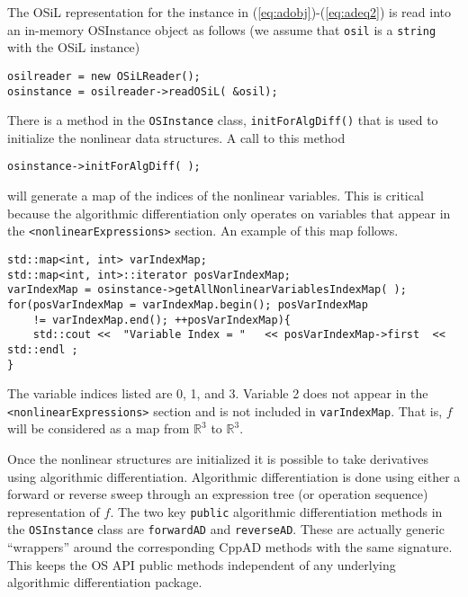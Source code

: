 \documentclass[11pt]{article}
\renewcommand{\_}{{\char"5F}}
\renewcommand{\{}{{\char"7B}}
\renewcommand{\}}{{\char"7D}}
\renewcommand{\^}{{\char"0D}}
\renewcommand{\'}{{\char"0D}}
\begin{document}
The OSiL representation for the instance  in  (\ref{eq:adobj})-(\ref{eq:adeq2})  is read into an in-memory OSInstance object as follows (we assume that {\tt osil} is a {\tt string} with the OSiL instance)
\begin{verbatim}
osilreader = new OSiLReader();
osinstance = osilreader->readOSiL( &osil);
\end{verbatim}
There is a method in the {\tt OSInstance} class, {\tt initForAlgDiff()} that is used to initialize the nonlinear data structures.  A call to this method
\begin{verbatim}
osinstance->initForAlgDiff( );
\end{verbatim}
will generate a map of the indices of the nonlinear variables. This is critical because the algorithmic differentiation only operates on variables that appear in the {\tt <nonlinearExpressions>} section.  An example of this map follows.
\begin{verbatim}
std::map<int, int> varIndexMap;
std::map<int, int>::iterator posVarIndexMap;
varIndexMap = osinstance->getAllNonlinearVariablesIndexMap( );
for(posVarIndexMap = varIndexMap.begin(); posVarIndexMap
	!= varIndexMap.end(); ++posVarIndexMap){
	std::cout <<  "Variable Index = "   << posVarIndexMap->first  << std::endl ;
}
\end{verbatim}
The variable indices listed are 0, 1, and 3. Variable 2 does not appear in the {\tt <nonlinearExpressions>} section and is not included in {\tt varIndexMap}.  That is, $f$ will be considered as a map from $ \mathbb{R}^{3}$ to $ \mathbb{R}^{3}.$

Once the nonlinear structures are initialized it is possible to take derivatives using algorithmic differentiation.   Algorithmic differentiation is done using either a forward or reverse sweep through an expression tree (or operation sequence) representation of $f$.  The two key {\tt public} algorithmic differentiation  methods in the {\tt OSInstance} class are {\tt forwardAD} and {\tt reverseAD}.   These are actually  generic ``wrappers'' around the corresponding CppAD methods with the same signature.  This keeps the OS API  public methods independent of any underlying algorithmic differentiation package.
\end{document}
